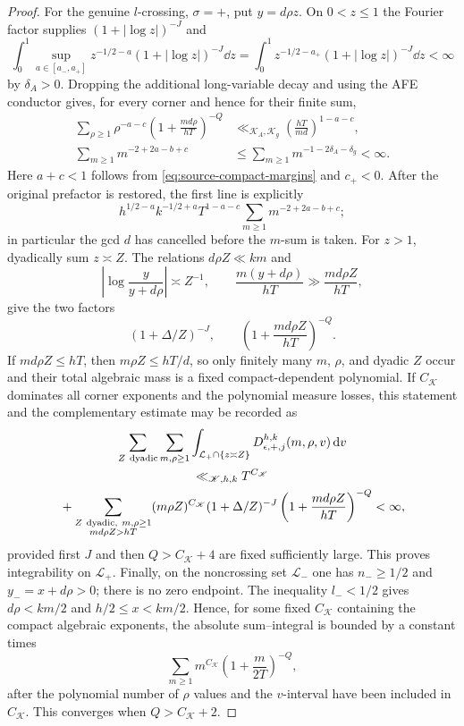 \begin{proof}
For the genuine $l$-crossing, $\sigma=+$, put $y=d\rho z$.  On $0<z\leq1$
the Fourier factor supplies $(1+|\log z|)^{-J}$ and
\begin{equation}\label{eq:compact-l-end-integral}
 \int_0^1\sup_{a\in[a_-,a_+]}
 z^{-1/2-a}(1+|\log z|)^{-J}\dd z
 =\int_0^1z^{-1/2-a_+}(1+|\log z|)^{-J}\dd z
 <\infty
\end{equation}
by $\delta_A>0$.  Dropping the additional long-variable decay and using the
AFE conductor gives, for every corner and hence for their finite sum,
\begin{align}
 \sum_{\rho\geq1}\rho^{-a-c}
 \left(1+\frac{md\rho}{hT}\right)^{-Q}
 &\ll_{\mathscr K_A,\mathscr K_g}
 \left(\frac{hT}{md}\right)^{1-a-c},
 \label{eq:compact-l-rho-sum}\\
 \sum_{m\geq1}m^{-2+2a-b+c}
 &\leq\sum_{m\geq1}m^{-1-2\delta_A-\delta_g}<\infty.
 \label{eq:compact-l-m-sum}
\end{align}
Here $a+c<1$ follows from \eqref{eq:source-compact-margins} and $c_+<0$.
After the original prefactor is restored, the first line is explicitly
\[
 h^{1/2-a}k^{-1/2+a}T^{1-a-c}
 \sum_{m\geq1}m^{-2+2a-b+c};
\]
in particular the gcd $d$ has cancelled before the $m$-sum is taken.
For $z>1$, dyadically sum $z\asymp Z$.  The relations
$d\rho Z\ll km$ and
\[
 \left|\log\frac{y}{y+d\rho}\right|\asymp Z^{-1},\qquad
 \frac{m(y+d\rho)}{hT}\gg\frac{md\rho Z}{hT},
\]
give the two factors
\[
 (1+\Delta/Z)^{-J},\qquad
 \left(1+\frac{md\rho Z}{hT}\right)^{-Q}.
\]
If $md\rho Z\leq hT$, then
$m\rho Z\leq hT/d$, so only finitely many $m$, $\rho$, and dyadic $Z$ occur and
their total algebraic mass is a fixed compact-dependent polynomial.  If
$C_{\mathscr K}$ dominates all corner exponents and the polynomial measure
losses, this statement and the complementary estimate may be recorded as
\begin{multline}\label{eq:compact-l-large-bound}
 \sum_{Z\ \text{\rm dyadic}}\sum_{m,\rho\geq1}
 \int_{\mathcal L_+\cap\{z\asymp Z\}}
 D_{\epsilon,+,j}^{h,k}(m,\rho,v)\,\mathrm d v\\
 \ll_{\mathscr K,h,k}T^{C_{\mathscr K}}\\
 {}+\sum_{\substack{Z\ \text{\rm dyadic},\ m,\rho\geq1\\md\rho Z>hT}}
 (m\rho Z)^{C_{\mathscr K}}
 (1+\Delta/Z)^{-J}
 \left(1+\frac{md\rho Z}{hT}\right)^{-Q}<\infty,
\end{multline}
provided first $J$ and then $Q>C_{\mathscr K}+4$ are fixed sufficiently
large.  This proves
integrability on $\mathcal L_+$.  Finally, on the noncrossing set
$\mathcal L_-$ one has
$n_-\geq1/2$ and $y_-=x+d\rho>0$; there is no zero endpoint.  The inequality
$l_-<1/2$ gives $d\rho<km/2$ and $h/2\leq x<km/2$.  Hence, for some fixed
$C_{\mathscr K}$ containing the compact algebraic exponents, the absolute
sum--integral is bounded by a constant times
\[
 \sum_{m\geq1}m^{C_{\mathscr K}}
 \left(1+\frac{m}{2T}\right)^{-Q},
\]
after the polynomial number of $\rho$ values and the $v$-interval have been
included in $C_{\mathscr K}$.  This converges when
$Q>C_{\mathscr K}+2$.


\end{proof}

